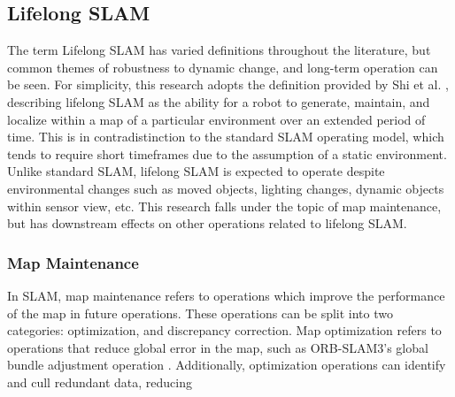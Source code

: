 \subsection{Lifelong SLAM}

The term Lifelong SLAM has varied definitions throughout the literature, but common themes of robustness to dynamic change, and long-term operation can be seen. For simplicity, this research adopts the definition provided by Shi et al. \cite{shiAreWeReady2020}, describing lifelong SLAM as the ability for a robot to generate, maintain, and localize within a map of a particular environment over an extended period of time. This is in contradistinction to the standard SLAM operating model, which tends to require short timeframes due to the assumption of a static environment. Unlike standard SLAM, lifelong SLAM is expected to operate despite environmental changes such as moved objects, lighting changes, dynamic objects within sensor view, etc. This research falls under the topic of map maintenance, but has downstream effects on other operations related to lifelong SLAM.

\subsubsection{Map Maintenance}

In SLAM, map maintenance refers to operations which improve the performance of the map in future operations. These operations can be split into two categories: optimization, and discrepancy correction. Map optimization refers to operations that reduce global error in the map, such as ORB-SLAM3's global bundle adjustment operation \cite{camposORBSLAM3AccurateOpenSource2021}. Additionally, optimization operations can identify and cull redundant data, reducing 